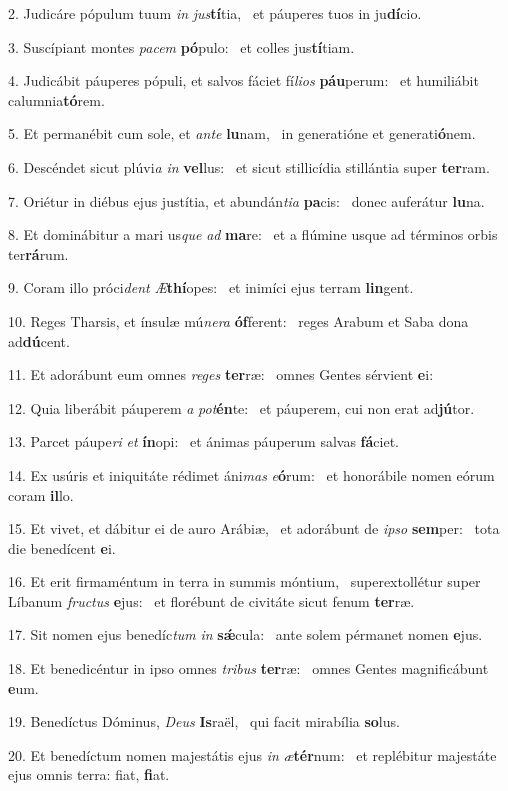 2. Judicáre pópulum tuum \textit{in} \textit{jus}\textbf{tí}tia, \ast\  et páuperes tuos in ju\textbf{dí}cio.\

3. Suscípiant montes \textit{pa}\textit{cem} \textbf{pó}pulo: \ast\  et colles jus\textbf{tí}tiam.\

4. Judicábit páuperes pópuli, et salvos fáciet fí\textit{li}\textit{os} \textbf{páu}perum: \ast\  et humiliábit calumnia\textbf{tó}rem.\

5. Et permanébit cum sole, et \textit{an}\textit{te} \textbf{lu}nam, \ast\  in generatióne et generati\textbf{ó}nem.\

6. Descéndet sicut plúvi\textit{a} \textit{in} \textbf{vel}lus: \ast\  et sicut stillicídia stillántia super \textbf{ter}ram.\

7. Oriétur in diébus ejus justítia, et abundán\textit{ti}\textit{a} \textbf{pa}cis: \ast\  donec auferátur \textbf{lu}na.\

8. Et dominábitur a mari us\textit{que} \textit{ad} \textbf{ma}re: \ast\  et a flúmine usque ad términos orbis ter\textbf{rá}rum.\

9. Coram illo próci\textit{dent} \textit{Æ}\textbf{thí}opes: \ast\  et inimíci ejus terram \textbf{lin}gent.\

10. Reges Tharsis, et ínsulæ mú\textit{ne}\textit{ra} \textbf{óf}ferent: \ast\  reges Arabum et Saba dona ad\textbf{dú}cent.\

11. Et adorábunt eum omnes \textit{re}\textit{ges} \textbf{ter}ræ: \ast\  omnes Gentes sérvient \textbf{e}i:\

12. Quia liberábit páuperem \textit{a} \textit{pot}\textbf{én}te: \ast\  et páuperem, cui non erat ad\textbf{jú}tor.\

13. Parcet páupe\textit{ri} \textit{et} \textbf{ín}opi: \ast\  et ánimas páuperum salvas \textbf{fá}ciet.\

14. Ex usúris et iniquitáte rédimet áni\textit{mas} \textit{e}\textbf{ó}rum: \ast\  et honorábile nomen eórum coram \textbf{il}lo.\

15. Et vivet, et dábitur ei de auro Arábiæ, \dag\  et adorábunt de \textit{ip}\textit{so} \textbf{sem}per: \ast\  tota die benedícent \textbf{e}i.\

16. Et erit firmaméntum in terra in summis móntium, \dag\  superextollétur super Líbanum \textit{fruc}\textit{tus} \textbf{e}jus: \ast\  et florébunt de civitáte sicut fenum \textbf{ter}ræ.\

17. Sit nomen ejus benedíc\textit{tum} \textit{in} \textbf{sǽ}cula: \ast\  ante solem pérmanet nomen \textbf{e}jus.\

18. Et benedicéntur in ipso omnes \textit{tri}\textit{bus} \textbf{ter}ræ: \ast\  omnes Gentes magnificábunt \textbf{e}um.\

19. Benedíctus Dóminus, \textit{De}\textit{us} \textbf{Is}raël, \ast\  qui facit mirabília \textbf{so}lus.\

20. Et benedíctum nomen majestátis ejus \textit{in} \textit{æ}\textbf{tér}num: \ast\  et replébitur majestáte ejus omnis terra: fiat, \textbf{fi}at.\

